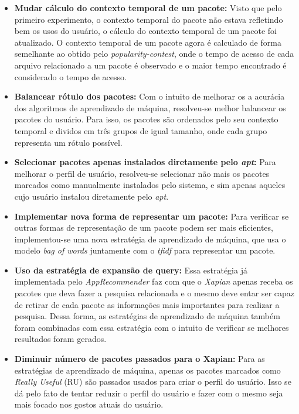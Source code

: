 \begin{itemize}
   \item \textbf{Mudar cálculo do contexto temporal de um pacote: } Visto que
   pelo primeiro experimento, o contexto temporal do pacote não estava
   refletindo bem os usos do usuário, o cálculo do contexto temporal de um
   pacote foi atualizado. O contexto temporal de um pacote agora é calculado de
   forma semelhante ao obtido pelo \textit{popularity-contest}, onde o tempo de
   acesso de cada arquivo relacionado a um pacote é observado e o maior tempo
   encontrado é considerado o tempo de acesso.

   \item \textbf{Balancear rótulo dos pacotes: } Com o intuito de melhorar os
   a acurácia dos algoritmos de aprendizado de máquina, resolveu-se melhor
   balancear os pacotes do usuário. Para isso, os pacotes são ordenados pelo seu
   contexto temporal e dividos em três grupos de igual tamanho, onde cada grupo
   representa um rótulo possível.

   \item \textbf{Selecionar pacotes apenas instalados diretamente pelo
   \textit{apt}:} Para melhorar o perfil de usuário, resolveu-se selecionar não
   mais os pacotes marcados como manualmente instalados pelo sistema, e sim
   apenas aqueles cujo usuário instalou diretamente pelo \textit{apt}.

   \item \textbf{Implementar nova forma de representar um pacote: } Para
   verificar se outras formas de representação de um pacote podem ser mais
   eficientes, implementou-se uma nova estratégia de aprendizado de máquina, que
   usa o modelo \textit{bag of words} juntamente com o \textit{tfidf} para
   representar um pacote.

   \item \textbf{Uso da estratégia de expansão de query: } Essa estratégia já
   implementada pelo \textit{AppRecommender} faz com que o \textit{Xapian}
   apenas receba os pacotes que deva fazer a pesquisa relacionada e o mesmo deve
   entar ser capaz de retirar de cada pacote as informações mais importantes
   para realizar a pesquisa. Dessa forma, as estratégias de aprendizado de
   máquina também foram combinadas com essa estratégia com o intuito de
   verificar se melhores resultados foram gerados.

   \item \textbf{Diminuir número de pacotes passados para o Xapian:} Para as
   estratégias de aprendizado de máquina, apenas os pacotes marcados como
   \textit{Really Useful} (RU) são passados usados para criar o perfil do
   usuário. Isso se dá pelo fato de tentar reduzir o perfil do usuário e fazer
   com o mesmo seja mais focado nos gostos atuais do usuário.
\end{itemize}

